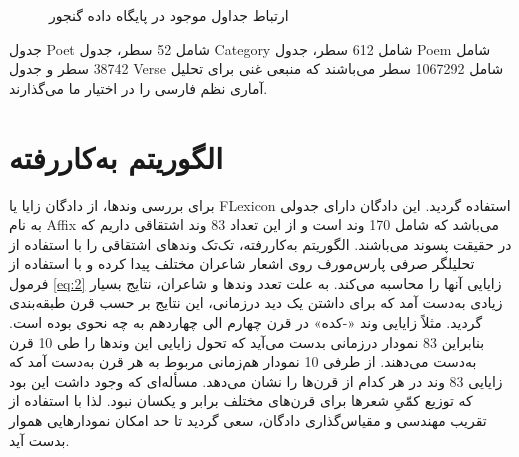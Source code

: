 \documentclass[12pt,onecolumn,a4paper]{article}
\begin{document}
    \begin{figure}[H]
        \centering
        \caption{ ارتباط جداول موجود در پایگاه داده گنجور}
        \label{fig:1}
    \end{figure}
    \par
    جدول Poet شامل 52 سطر، جدول Category شامل 612 سطر، جدول Poem شامل 38742 سطر و جدول Verse شامل 1067292 سطر می‌باشند که منبعی غنی برای تحلیل آماری نظم فارسی را در اختیار ما می‌گذارند.

    \section{الگوریتم به‌کاررفته}
    برای بررسی وندها، از دادگان زایا یا FLexicon \citep{eslami_83} استفاده گردید. این دادگان دارای جدولی به نام Affix می‌باشد که شامل 170 وند است و از این تعداد 83 وند اشتقاقی داریم که در حقیقت پسوند می‌باشند.  الگوریتم به‌کاررفته، تک‌تک وندهای اشتقاقی را با استفاده از تحلیلگر صرفی پارس‌مورف \citep{mavaji_90} روی اشعار شاعران مختلف پیدا کرده و با استفاده از فرمول \ref{eq:2} زایایی آنها را محاسبه می‌کند. به علت تعدد وندها و شاعران، نتایج بسیار زیادی به‌دست آمد که برای داشتن یک دید درزمانی، این نتایج بر حسب قرن طبقه‌بندی گردید. مثلاً زایایی وند  «-کده» در قرن چهارم الی چهاردهم به چه نحوی بوده است. بنابراین 83 نمودار درزمانی بدست می‌آید که تحول زایایی این وندها را طی 10 قرن به‌دست می‌دهند. از طرفی 10 نمودار هم‌زمانی مربوط به هر قرن به‌دست آمد که زایایی 83 وند در هر کدام از قرن‌ها را نشان می‌دهد. مسأله‌ای که وجود داشت این بود که توزیع کمّیِ شعرها برای قرن‌های مختلف برابر و یکسان نبود. لذا با استفاده از تقریب مهندسی و مقیاس‌گذاری دادگان، سعی گردید تا حد امکان نمودارهایی هموار بدست آید.
\end{document}
